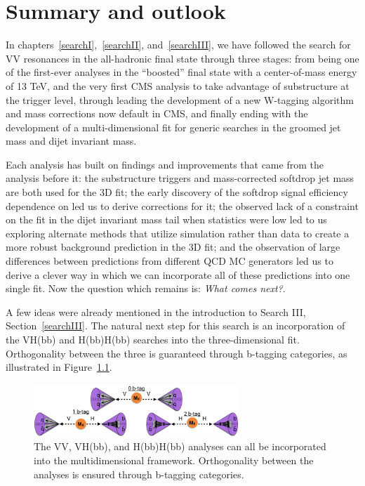 \clearpage

\chapter{Summary and outlook}
\label{sec:searchIII:outlook}
In chapters~\ref{searchI},~\ref{searchII}, and~\ref{searchIII}, we have followed the search for VV resonances in the all-hadronic final state through three stages: from being one of the first-ever analyses in the ``boosted'' final state with a center-of-mass energy of 13 TeV, and the very first CMS analysis to take advantage of substructure at the trigger level, through leading the development of a new W-tagging algorithm and mass corrections now default in CMS, and finally ending with the development of a multi-dimensional fit for generic searches in the groomed jet mass and dijet invariant mass.\par
Each analysis has built on findings and improvements that came from the analysis before it: the substructure triggers and mass-corrected softdrop jet mass are both used for the 3D fit; the early discovery of the softdrop signal efficiency dependence on \PT led us to derive corrections for it; the observed lack of a constraint on the fit in the dijet invariant mass tail when statistics were low led to us exploring alternate methods that utilize simulation rather than data to create a more robust background prediction in the 3D fit; and the observation of large differences between predictions from different QCD MC generators led us to derive a clever way in which we can incorporate all of these predictions into one single fit. 
Now the question which remains is: \emph{What comes next?}.\par
A few ideas were already mentioned in the introduction to Search III, Section~\ref{searchIII}. The natural next step for this search is an incorporation of the VH(bb) and H(bb)H(bb) searches into the three-dimensional fit. Orthogonality between the three is guaranteed through b-tagging categories, as illustrated in Figure~\ref{fig:outlook:vvvhhh}.
\begin{figure}[h!]
\centering
\includegraphics[width=0.69\textwidth]{figures/analysis/search3/misc/VVVHHH.png}
\caption{The VV, VH(bb), and H(bb)H(bb) analyses can all be incorporated into the multidimensional framework. Orthogonality between the analyses is ensured through b-tagging categories.}
\label{fig:outlook:vvvhhh}
\end{figure}
